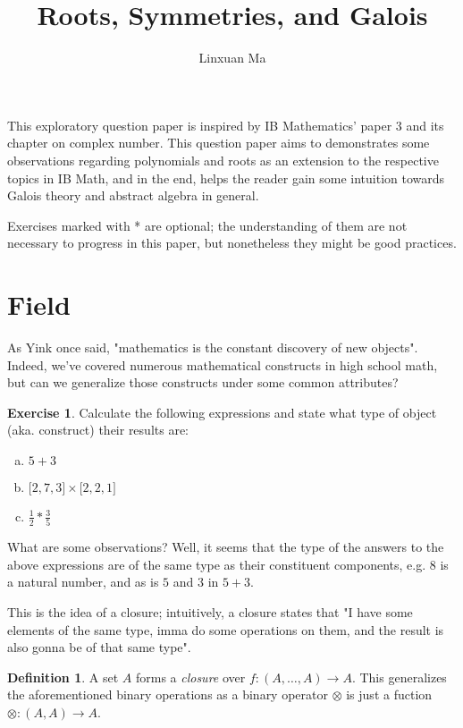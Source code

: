 \documentclass[12pt]{article}
\title{\vspace{-2.0cm}Roots, Symmetries, and Galois}
\author{Linxuan Ma}
\theoremstyle{definition}
\newtheorem{defn}{Definition}[section]
\newtheorem{ex}{Exercise}[section]
\begin{document}
	\maketitle
	
	This exploratory question paper is inspired by IB Mathematics' paper 3 and its chapter on complex number. This question paper aims to demonstrates some observations regarding polynomials and roots as an extension to the respective topics in IB Math, and in the end, helps the reader gain some intuition towards Galois theory and abstract algebra in general.
	
	Exercises marked with * are optional; the understanding of them are not necessary to progress in this paper, but nonetheless they might be good practices.
	
	\section{Field}
	
	As Yink once said, "mathematics is the constant discovery of new objects". Indeed, we've covered numerous mathematical constructs in high school math, but can we generalize those constructs under some common attributes?
	
	\begin{ex}
		Calculate the following expressions and state what type of object (aka. construct) their results are:
		
		\begin{enumerate}[a.]
			\item $5 + 3$
			\item $\lbrack 2, 7, 3\rbrack \times \lbrack 2, 2, 1\rbrack$
			\item $\frac{1}{2} * \frac{3}{5}$
		\end{enumerate}
	\end{ex}
	
	What are some observations? Well, it seems that the type of the answers to the above expressions are of the same type as their constituent components, e.g. $8$ is a natural number, and as is $5$ and $3$ in $5 + 3$.
	
	This is the idea of a closure; intuitively, a closure states that "I have some elements of the same type, imma do some operations on them, and the result is also gonna be of that same type".
	
	\begin{defn}
		A set $A$ forms a \emph{closure} over $f: (A, \dots, A) \to A$. This generalizes the aforementioned binary operations as a binary operator $\otimes$ is just a fuction $\otimes: (A, A) \to A$.
	\end{defn}
	
\end{document}
